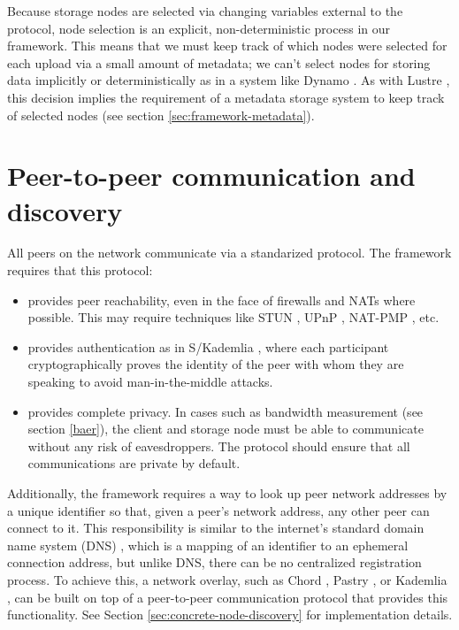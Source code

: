 \documentclass[8pt,fleqn,openany]{book}
\begin{document}
Because storage
nodes are selected via changing variables external to the protocol, node
selection is an explicit, non-deterministic process in our framework. This means
that we must keep track of which nodes were selected for each upload via a
small amount of metadata; we can't select nodes for storing data implicitly or
deterministically as in a system like Dynamo \cite{dynamo}. As with Lustre
\cite{lustre}, this decision
implies the requirement of a metadata storage system to keep track
of selected nodes (see section \ref{sec:framework-metadata}).

\section{Peer-to-peer communication and discovery}

All peers on the network communicate via a standarized protocol. The
framework requires that this protocol:

\begin{itemize}
\item provides peer reachability, even in the face of firewalls
and NATs where possible.
This may require techniques like STUN \cite{stun}, UPnP \cite{upnp},
NAT-PMP \cite{natpmp}, etc.
\item provides authentication as in S/Kademlia \cite{skad},
where each participant cryptographically
proves the identity of the peer with whom they are speaking to avoid
man-in-the-middle attacks.
\item provides complete privacy. In cases such as bandwidth measurement
(see section \ref{baer}), the client and storage node must be able
to communicate without any risk of eavesdroppers. The protocol should
ensure that all communications are private by default.
\end{itemize}

Additionally, the framework requires a way to look up peer network addresses
by a unique identifier so that, given a peer's network address, any other
peer can connect to it. This responsibility is similar to the internet's
standard domain name system (DNS) \cite{dns},
which is a mapping of an identifier to an
ephemeral connection address, but unlike DNS, there can be no centralized
registration process.
To achieve this, a network overlay, such as Chord \cite{chord},
Pastry \cite{pastry}, or Kademlia \cite{kad}, can be
built on top of a peer-to-peer communication protocol that provides this
functionality. See Section \ref{sec:concrete-node-discovery} for
implementation details.
\end{document}
